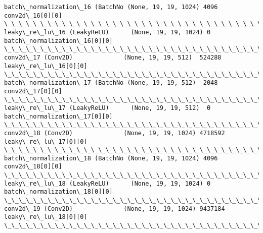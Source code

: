 \documentclass[11pt]{article}
\begin{document}
\begin{Verbatim}[commandchars=\\\{\}]
batch\_normalization\_16 (BatchNo (None, 19, 19, 1024) 4096        conv2d\_16[0][0]                  
\_\_\_\_\_\_\_\_\_\_\_\_\_\_\_\_\_\_\_\_\_\_\_\_\_\_\_\_\_\_\_\_\_\_\_\_\_\_\_\_\_\_\_\_\_\_\_\_\_\_\_\_\_\_\_\_\_\_\_\_\_\_\_\_\_\_\_\_\_\_\_\_\_\_\_\_\_\_\_\_\_\_\_\_\_\_\_\_\_\_\_\_\_\_\_\_\_\_
leaky\_re\_lu\_16 (LeakyReLU)      (None, 19, 19, 1024) 0           batch\_normalization\_16[0][0]     
\_\_\_\_\_\_\_\_\_\_\_\_\_\_\_\_\_\_\_\_\_\_\_\_\_\_\_\_\_\_\_\_\_\_\_\_\_\_\_\_\_\_\_\_\_\_\_\_\_\_\_\_\_\_\_\_\_\_\_\_\_\_\_\_\_\_\_\_\_\_\_\_\_\_\_\_\_\_\_\_\_\_\_\_\_\_\_\_\_\_\_\_\_\_\_\_\_\_
conv2d\_17 (Conv2D)              (None, 19, 19, 512)  524288      leaky\_re\_lu\_16[0][0]             
\_\_\_\_\_\_\_\_\_\_\_\_\_\_\_\_\_\_\_\_\_\_\_\_\_\_\_\_\_\_\_\_\_\_\_\_\_\_\_\_\_\_\_\_\_\_\_\_\_\_\_\_\_\_\_\_\_\_\_\_\_\_\_\_\_\_\_\_\_\_\_\_\_\_\_\_\_\_\_\_\_\_\_\_\_\_\_\_\_\_\_\_\_\_\_\_\_\_
batch\_normalization\_17 (BatchNo (None, 19, 19, 512)  2048        conv2d\_17[0][0]                  
\_\_\_\_\_\_\_\_\_\_\_\_\_\_\_\_\_\_\_\_\_\_\_\_\_\_\_\_\_\_\_\_\_\_\_\_\_\_\_\_\_\_\_\_\_\_\_\_\_\_\_\_\_\_\_\_\_\_\_\_\_\_\_\_\_\_\_\_\_\_\_\_\_\_\_\_\_\_\_\_\_\_\_\_\_\_\_\_\_\_\_\_\_\_\_\_\_\_
leaky\_re\_lu\_17 (LeakyReLU)      (None, 19, 19, 512)  0           batch\_normalization\_17[0][0]     
\_\_\_\_\_\_\_\_\_\_\_\_\_\_\_\_\_\_\_\_\_\_\_\_\_\_\_\_\_\_\_\_\_\_\_\_\_\_\_\_\_\_\_\_\_\_\_\_\_\_\_\_\_\_\_\_\_\_\_\_\_\_\_\_\_\_\_\_\_\_\_\_\_\_\_\_\_\_\_\_\_\_\_\_\_\_\_\_\_\_\_\_\_\_\_\_\_\_
conv2d\_18 (Conv2D)              (None, 19, 19, 1024) 4718592     leaky\_re\_lu\_17[0][0]             
\_\_\_\_\_\_\_\_\_\_\_\_\_\_\_\_\_\_\_\_\_\_\_\_\_\_\_\_\_\_\_\_\_\_\_\_\_\_\_\_\_\_\_\_\_\_\_\_\_\_\_\_\_\_\_\_\_\_\_\_\_\_\_\_\_\_\_\_\_\_\_\_\_\_\_\_\_\_\_\_\_\_\_\_\_\_\_\_\_\_\_\_\_\_\_\_\_\_
batch\_normalization\_18 (BatchNo (None, 19, 19, 1024) 4096        conv2d\_18[0][0]                  
\_\_\_\_\_\_\_\_\_\_\_\_\_\_\_\_\_\_\_\_\_\_\_\_\_\_\_\_\_\_\_\_\_\_\_\_\_\_\_\_\_\_\_\_\_\_\_\_\_\_\_\_\_\_\_\_\_\_\_\_\_\_\_\_\_\_\_\_\_\_\_\_\_\_\_\_\_\_\_\_\_\_\_\_\_\_\_\_\_\_\_\_\_\_\_\_\_\_
leaky\_re\_lu\_18 (LeakyReLU)      (None, 19, 19, 1024) 0           batch\_normalization\_18[0][0]     
\_\_\_\_\_\_\_\_\_\_\_\_\_\_\_\_\_\_\_\_\_\_\_\_\_\_\_\_\_\_\_\_\_\_\_\_\_\_\_\_\_\_\_\_\_\_\_\_\_\_\_\_\_\_\_\_\_\_\_\_\_\_\_\_\_\_\_\_\_\_\_\_\_\_\_\_\_\_\_\_\_\_\_\_\_\_\_\_\_\_\_\_\_\_\_\_\_\_
conv2d\_19 (Conv2D)              (None, 19, 19, 1024) 9437184     leaky\_re\_lu\_18[0][0]             
\_\_\_\_\_\_\_\_\_\_\_\_\_\_\_\_\_\_\_\_\_\_\_\_\_\_\_\_\_\_\_\_\_\_\_\_\_\_\_\_\_\_\_\_\_\_\_\_\_\_\_\_\_\_\_\_\_\_\_\_\_\_\_\_\_\_\_\_\_\_\_\_\_\_\_\_\_\_\_\_\_\_\_\_\_\_\_\_\_\_\_\_\_\_\_\_\_\_

\end{Verbatim}
\end{document}
